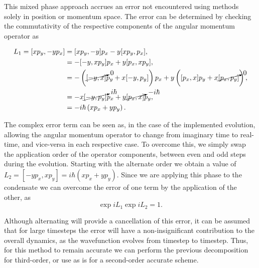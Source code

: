  This mixed phase approach accrues an error not encountered using methods solely in position or momentum space. The error can be determined by checking the commutativity of the respective components of the angular momentum operator as

 \begin{subequations}
 \begin{align}
 	L_1 = [x p_y,-y p_x] &= [x p_y,-y] p_x  -  y[x p_y,p_x], \\
 				   &= -[-y,x p_y] p_x + y [p_x, x p_y], \\
 				   &= -\left( {\cancelto{0}{[-y,x]}} p_y + x [-y,p_y] \right) p_x + y \left( [p_x,x] p_y + x {\cancelto{0}{[p_x,p_y]}} \right), \\
 				   &= -x {\cancelto{i\hbar}{[-y, p_y]}} p_x + y {\cancelto{-i\hbar}{[p_x,x]}} p_y, \\
 				   &= -i\hbar \left(x p_x + y p_y \right).
 \end{align}
\end{subequations}

 The complex error term can be seen as, in the case of the implemented evolution, allowing the angular momentum operator to change from imaginary time to real-time, and vice-versa in each respective case. To overcome this, we simply swap the application order of the operator components, between even and odd steps during the evolution. Starting with the alternate order we obtain a value of $L_2 = [-y p_x, x p_y] = i\hbar \left(x p_x + y p_y \right)$. Since we are applying this phase to the condensate we can overcome the error of one term by the application of the other, as
 \begin{equation}
 \exp{i L_1}\exp{i L_2} = 1.
 \end{equation}

 Although alternating will provide a cancellation of this error, it can be assumed that for large timesteps the error will have a non-insignificant contribution to the overall dynamics, as the wavefunction evolves from timestep to timestep. Thus, for this method to remain accurate we can perform the previous decomposition for third-order, or use as is for a second-order accurate scheme.

